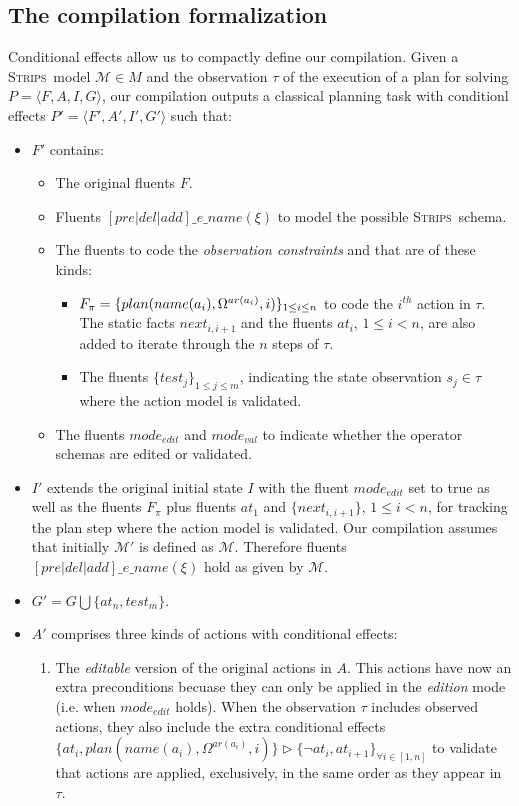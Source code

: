 \documentclass[letterpaper]{article} %
\newcommand{\tup}[1]{{\langle #1 \rangle}}
\newcommand{\strips}{\textsc{Strips}}     %
\begin{document}
\subsection{The compilation formalization}
Conditional effects allow us to compactly define our compilation. Given a \strips\ model $\mathcal{M}\in M$ and the observation $\tau$ of the execution of a plan for solving $P=\tup{F,A,I,G}$, our compilation outputs a classical planning task with conditionl effects $P'=\tup{F',A',I',G'}$ such that:
\begin{itemize}
\item $F'$ contains:
\begin{itemize}
\item The original fluents $F$. 
\item Fluents $[pre|del|add]\_e\_name(\xi)$ to model the possible \strips\ schema. 
\item The fluents to code the {\em observation constraints} and that are of these kinds:
\begin{itemize}
\item $F_{\pi}=\{plan(name(a_i),\Omega^{ar(a_i)},i)\}_{\small 1\leq i\leq n}$ to code the $i^{th}$ action in $\tau$. The static facts $next_{i,i+1}$ and the fluents $at_i$, {\small $1\leq i< n$}, are also added to iterate through the $n$ steps of $\tau$.
\item The fluents $\{test_j\}_{1\leq j\leq m}$, indicating the state observation $s_j\in\tau$ where the action model is validated.
\end{itemize}
\item The fluents $mode_{edit}$ and $mode_{val}$ to indicate whether the operator schemas are edited or validated.
\end{itemize}
\item $I'$ extends the original initial state $I$ with the fluent $mode_{edit}$ set to true as well as the fluents $F_{\pi}$ plus fluents $at_1$ and $\{next_{i,i+1}\}$, {\small $1\leq i<n$}, for tracking the plan step where the action model is validated. Our compilation assumes that initially $\mathcal{M}'$ is defined as $\mathcal{M}$. Therefore fluents $[pre|del|add]\_e\_name(\xi)$ hold as given by $\mathcal{M}$.

\item $G'=G\bigcup\{at_n,test_m\}$.
\item $A'$ comprises three kinds of actions with conditional effects:
\begin{enumerate}
\item The {\em editable} version of the original actions in $A$. This actions have now  an extra preconditions  becuase they can only be applied in the {\em edition} mode (i.e. when $mode_{edit}$ holds). When the observation $\tau$ includes observed actions, they also include the extra conditional effects $\{at_{i},plan(name(a_i),\Omega^{ar(a_i)},i)\}\rhd\{\neg at_{i},at_{i+1}\}_{\forall i\in [1,n]}$ to validate that actions are applied, exclusively, in the same order as they appear in $\tau$.\\


\end{enumerate}
\end{itemize}
\end{document}
